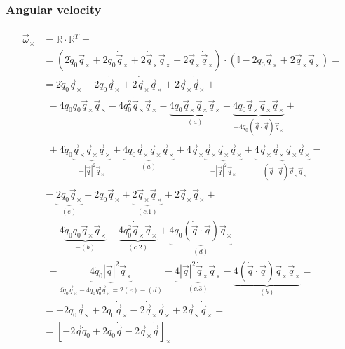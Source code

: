 \documentclass[letterpaper,10pt,english]{jupyterBook}
\begin{document}
\subsubsection{Angular velocity}
\label{\detokenize{ch/kinematics-rotations-param-quaternions:angular-velocity}}\label{\detokenize{ch/kinematics-rotations-param-quaternions:classical-mechanics-kinematics-rotations-quaternions-angular-velocity}}\begin{equation*}
\begin{split}\begin{aligned}
  \vec{\omega}_{\times} 
  & = \dot{\mathbb{R}} \cdot \mathbb{R}^T = \\
  & = \left( 2 \dot{q}_0 \vec{q}_\times + 2 q_0 \dot{\vec{q}}_{\times} + 2 \dot{\vec{q}}_\times \vec{q}_\times + 2 \vec{q}_\times \dot{\vec{q}}_\times \right) \cdot \left( \mathbb{I} - 2 q_0 \vec{q}_\times + 2 \vec{q}_{\times} \vec{q}_{\times} \right) = \\
  & = 2 \dot{q}_0 \vec{q}_\times + 2 q_0 \dot{\vec{q}}_{\times} + 2 \dot{\vec{q}}_\times \vec{q}_\times + 2 \vec{q}_\times \dot{\vec{q}}_\times + \\
  & \ \ - 4 \dot{q}_0 q_0 \vec{q}_\times \vec{q}_\times - 4 q_0^2 \dot{\vec{q}}_{\times} \vec{q}_\times - \underbrace{4 q_0 \dot{\vec{q}}_\times \vec{q}_\times \vec{q}_\times}_{(a)} - \underbrace{4 q_0 \vec{q}_\times \dot{\vec{q}}_\times \vec{q}_\times}_{-4 q_0 \left( \dot{\vec{q}} \cdot \vec{q} \right) \vec{q}_\times} +  \\
  & \ \ + 4 \dot{q}_0 \underbrace{\vec{q}_\times \vec{q}_\times \vec{q}_\times}_{-|\vec{q}|^2 \vec{q}_\times} + \underbrace{4 q_0 \dot{\vec{q}}_{\times} \vec{q}_\times \vec{q}_\times}_{(a)} + 4 \dot{\vec{q}}_\times \underbrace{\vec{q}_\times \vec{q}_\times \vec{q}_\times}_{-|\vec{q}|^2 \vec{q}_\times} + \underbrace{4 \vec{q}_\times \dot{\vec{q}}_\times \vec{q}_\times \vec{q}_\times}_{-\left( \dot{\vec{q}} \cdot \vec{q} \right) \vec{q}_\times \vec{q}_\times} = \\
  & = \underbrace{ 2 \dot{q}_0 \vec{q}_\times}_{(e)} + 2 q_0 \dot{\vec{q}}_{\times} + \underbrace{2 \dot{\vec{q}}_\times \vec{q}_\times}_{(c.1)} + 2 \vec{q}_\times \dot{\vec{q}}_\times + \\
  & \ \ - 4 \underbrace{\dot{q}_0 q_0 \vec{q}_\times \vec{q}_\times}_{-(b)} - \underbrace{4 q_0^2 \dot{\vec{q}}_{\times} \vec{q}_\times}_{(c.2)} + \underbrace{4 q_0 \left( \dot{\vec{q}} \cdot \vec{q} \right) \vec{q}_\times}_{(d)} +  \\
  & \ \ - \underbrace{4 \dot{q}_0 |\vec{q}|^2 \vec{q}_\times}_{ 4\dot{q}_0 \vec{q}_\times - 4 \dot{q}_0 q_0^2 \vec{q}_\times = 2(e)-(d)} - \underbrace{4 |\vec{q}|^2 \dot{\vec{q}}_\times \vec{q}_\times}_{(c.3)} - \underbrace{4\left( \dot{\vec{q}} \cdot \vec{q} \right) \vec{q}_\times \vec{q}_\times}_{(b)} = \\
  & = -2 \dot{q}_0 \vec{q}_\times + 2 q_0 \dot{\vec{q}}_\times - 2 \dot{\vec{q}}_\times \vec{q}_\times + 2 \vec{q}_\times \dot{\vec{q}}_\times =  \\
  & = \left[ - 2 \vec{q} \dot{q}_0 + 2 q_0 \dot{\vec{q}} - 2 \vec{q}_\times \dot{\vec{q}} \right]_\times
\end{aligned}\end{split}
\end{equation*}
\end{document}
